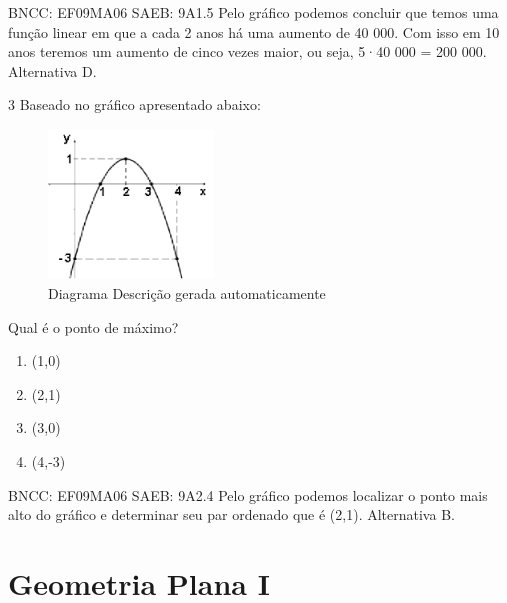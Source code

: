 \begin{escolha}
{{{\begin{escolha}
{{{BNCC: EF09MA06 SAEB: 9A1.5 Pelo gráfico podemos concluir que temos uma
função linear em que a cada 2 anos há uma aumento de 40 000. Com isso em
10 anos teremos um aumento de cinco vezes maior, ou seja, 5·40 000 = 200
000. Alternativa D.

\num{3} Baseado no gráfico apresentado abaixo:

\begin{figure}
\centering
\includegraphics[width=1.72515in,height=1.5668in]{./_SAEB_9_MAT/media/image156.png}
\caption{Diagrama Descrição gerada automaticamente}
\end{figure}

Qual é o ponto de máximo?

\begin{enumerate}

\item
  (1,0)
\item
  (2,1)
\item
  (3,0)
\item
  (4,-3)
\end{enumerate}

BNCC: EF09MA06 SAEB: 9A2.4 Pelo gráfico podemos localizar o ponto mais
alto do gráfico e determinar seu par ordenado que é (2,1). Alternativa
B.

\pagestyle{mat}
\chapter{Geometria Plana I}


\begin{itemize}


\end{itemize}}}}
\end{escolha}}}}
\end{escolha}
